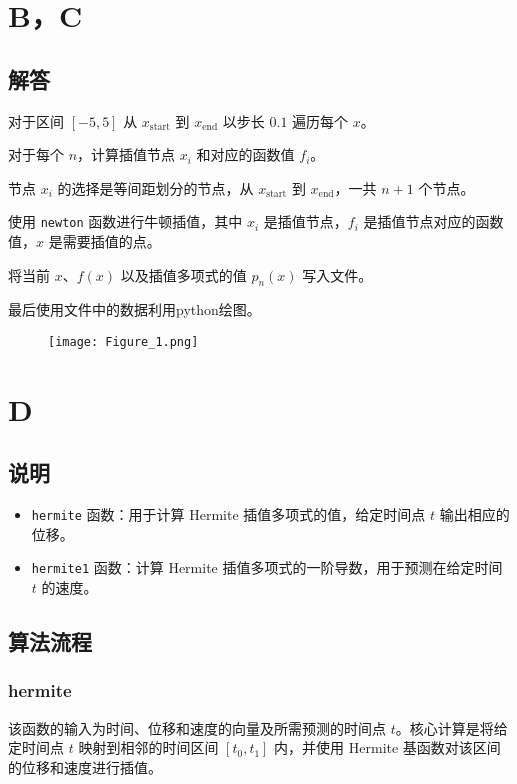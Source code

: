 \documentclass[a4paper]{article}
\begin{document}
\section*{B，C}
\subsection*{解答}
对于区间 $[-5, 5]$ 从 $x_{\text{start}}$ 到 $x_{\text{end}}$ 以步长 $0.1$ 遍历每个 $x$。

对于每个 $n$，计算插值节点 $x_i$ 和对应的函数值 $f_i$。

节点 $x_i$ 的选择是等间距划分的节点，从 $x_{\text{start}}$ 到 $x_{\text{end}}$，一共 $n+1$ 个节点。

使用 \texttt{newton} 函数进行牛顿插值，其中 $x_i$ 是插值节点，$f_i$ 是插值节点对应的函数值，$x$ 是需要插值的点。

将当前 $x$、$f(x)$ 以及插值多项式的值 $p_n(x)$ 写入文件。

最后使用文件中的数据利用python绘图。
\begin{figure}[H] 
\centering 
\texttt{[image: Figure\_1.png]}
\end{figure}
\section*{D}
\subsection*{说明}
\begin{itemize}
    \item \texttt{hermite} 函数：用于计算 Hermite 插值多项式的值，给定时间点 \( t \) 输出相应的位移。
    \item \texttt{hermite1} 函数：计算 Hermite 插值多项式的一阶导数，用于预测在给定时间 \( t \) 的速度。
\end{itemize}

\subsection*{算法流程}
\subsubsection*{hermite}
该函数的输入为时间、位移和速度的向量及所需预测的时间点 \( t \)。核心计算是将给定时间点 \( t \) 映射到相邻的时间区间 \([t_0, t_1]\) 内，并使用 Hermite 基函数对该区间的位移和速度进行插值。
\\
\\
\\
\\
\end{document}
